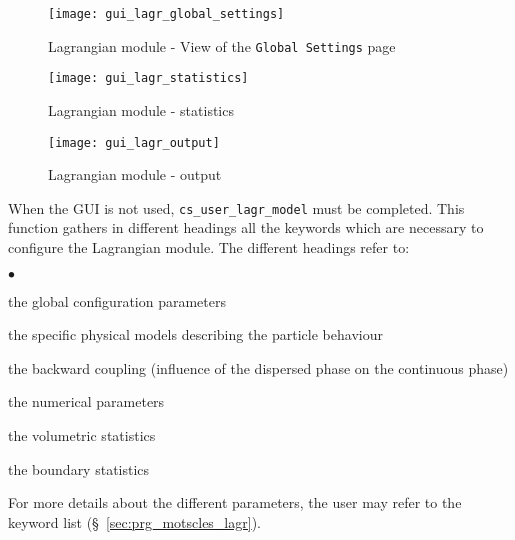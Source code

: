 \begin{figure}[ht]
\begin{center}
\texttt{[image: gui\_lagr\_global\_settings]}
\caption{Lagrangian module - View of the \texttt{Global Settings} page}
\label{fig:Ini-Lag1}
\end{center}
\end{figure}

\begin{figure}[ht]
\begin{center}
\texttt{[image: gui\_lagr\_statistics]}
\caption{Lagrangian module - statistics}
\label{fig:Ini-Lag4}
\end{center}
\end{figure}

\begin{figure}[ht]
\begin{center}
\texttt{[image: gui\_lagr\_output]}
\caption{Lagrangian module - output}
\label{fig:Ini-Lag5}
\end{center}
\end{figure}


\noindent
When the GUI is not used, \texttt{cs\_user\_lagr\_model} must be completed. This function
gathers in different headings all the keywords which are
necessary to configure the Lagrangian module. The different headings refer to:
\begin{list}{$\bullet$}{}
\item the global configuration parameters
\item the specific physical models describing the particle behaviour
\item the backward coupling (influence of the dispersed phase on the
      continuous phase)
\item the numerical parameters
\item the volumetric statistics
\item the boundary statistics
\end{list}
%
\noindent
For more details about the different parameters, the user may refer to the
keyword list (\S~\ref{sec:prg_motscles_lagr}).%


